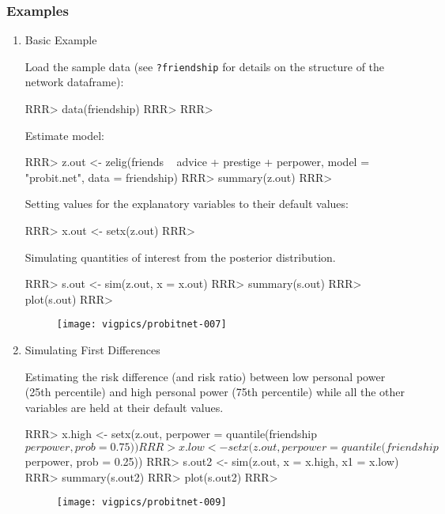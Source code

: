 \subsubsection{Examples}
\begin{enumerate}
\item Basic Example

Load the sample data (see {\tt ?friendship} for details on the structure of the network dataframe):

\begin{Schunk}
\begin{Sinput}
RRR> data(friendship)
RRR> 
RRR> 
\end{Sinput}
\end{Schunk}
Estimate model:

\begin{Schunk}
\begin{Sinput}
RRR> z.out <- zelig(friends ~ advice + prestige + perpower, model = "probit.net", data = friendship)
RRR> summary(z.out)
RRR> 
\end{Sinput}
\end{Schunk}
Setting values for the explanatory variables to their default values:

\begin{Schunk}
\begin{Sinput}
RRR> x.out <- setx(z.out)
RRR> 
\end{Sinput}
\end{Schunk}
Simulating quantities of interest from the posterior distribution.
\begin{Schunk}
\begin{Sinput}
RRR> s.out <- sim(z.out, x = x.out) 
RRR> summary(s.out) 
RRR> plot(s.out) 
RRR> 
\end{Sinput}
\end{Schunk}

\begin{figure}[here]
\centering
\texttt{[image: vigpics/probitnet-007]}
\label{fig:plotgam}
\end{figure}

\item Simulating First Differences

Estimating the risk difference (and risk ratio) between low personal power (25th percentile) and high personal power (75th percentile) while all the other variables are held at their default values. 

\begin{Schunk}
\begin{Sinput}
RRR> x.high <- setx(z.out, perpower = quantile(friendship$perpower, prob = 0.75))    
RRR> x.low  <- setx(z.out, perpower = quantile(friendship$perpower, prob = 0.25))
RRR> s.out2 <- sim(z.out, x = x.high, x1 = x.low)   
RRR> summary(s.out2)   
RRR> plot(s.out2)   
RRR> 
\end{Sinput}
\end{Schunk}

\begin{figure}[here]
\centering
\texttt{[image: vigpics/probitnet-009]}
\label{fig:plotgam}
\end{figure}

\end{enumerate}



